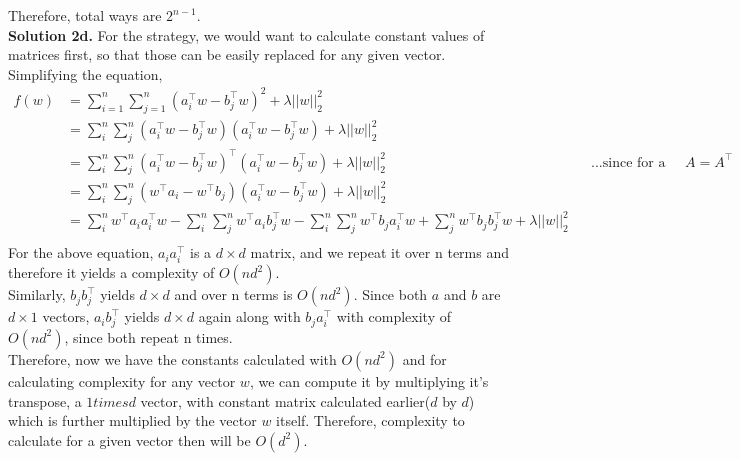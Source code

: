 \documentclass[11pt]{article}
\begin{document}
Therefore, total ways are $2^{n-1}$.\\
\linebreak
\textbf{Solution 2d.} For the strategy, we would want to calculate constant values of matrices first, so that those can be easily replaced for any given vector. Simplifying the equation, \\
\begin{align*}
f(w) & = \sum_{i=1}^{n}\sum_{j=1}^{n} (a_i^\top w - b_j^\top w)^2 + \lambda||w||_2^2 \\
& = \sum_i^n \sum_j^n (a_i^\top w - b_j^\top w) (a_i^\top w - b_j^\top w) + \lambda||w||_2^2 \\
& = \sum_i^n \sum_j^n (a_i^\top w - b_j^\top w)^\top (a_i^\top w - b_j^\top w) + \lambda||w||_2^2 && \text{...since for a scaler, $A = A^\top$} \\
& = \sum_i^n \sum_j^n ( w^\top a_i - w^\top b_j ) (a_i^\top w - b_j^\top w) + \lambda||w||_2^2 \\
& = \sum_i^n w^\top a_i a_i^\top w - \sum_i^n \sum_j^n w^\top a_i b_j^\top w - \sum_i^n \sum_j^n w^\top b_j a_i^\top w + \sum_j^n w^\top b_j b_j^\top w + \lambda||w||_2^2 \\
\end{align*} 
For the above equation, $a_i a_i^\top$ is a $d \times d$ matrix, and we repeat it over n terms and therefore it yields a complexity of $O(nd^2)$. \\
Similarly, $b_j b_j^\top$ yields $d \times d$ and over n terms is $O(nd^2)$. Since both $a$ and $b$ are $d \times 1$ vectors, $a_i b_j^\top $ yields $d \times d$ again along with $b_j a_i^\top$ with complexity of $O(nd^2)$, since both repeat n times.  \\
Therefore, now we have the constants calculated with $O(nd^2)$ and for calculating complexity for any vector $w$, we can compute it by multiplying it's transpose, a $1 times d$ vector, with constant matrix calculated earlier($d$ by $d$) which is further multiplied by the vector $w$ itself. Therefore, complexity to calculate for a given vector then will be $O(d^2)$.
\end{document}
